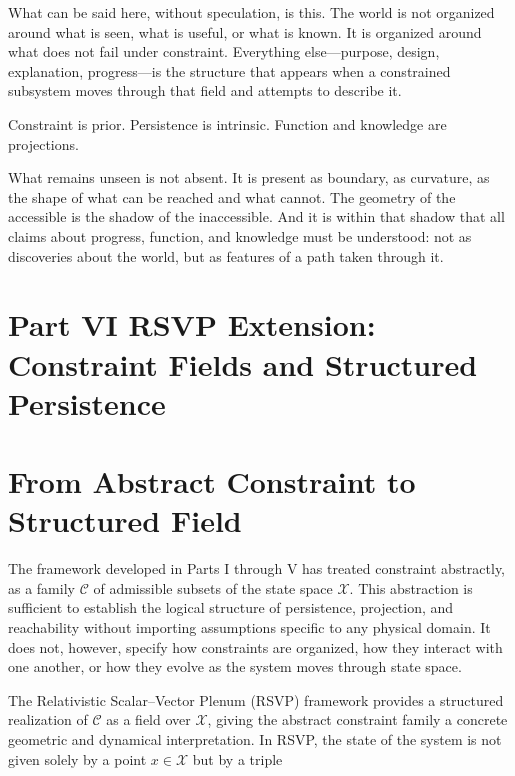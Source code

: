 \documentclass[12pt, a4paper, oneside]{article}
\theoremstyle{plain}
\theoremstyle{definition}
\theoremstyle{remark}
\newcommand{\X}{\mathcal{X}}
\newcommand{\C}{\mathcal{C}}
\begin{document}
What can be said here, without speculation, is this. The world is not organized around what is seen, what is useful, or what is known. It is organized around what does not fail under constraint. Everything else---purpose, design, explanation, progress---is the structure that appears when a constrained subsystem moves through that field and attempts to describe it.

Constraint is prior. Persistence is intrinsic. Function and knowledge are projections.

What remains unseen is not absent. It is present as boundary, as curvature, as the shape of what can be reached and what cannot. The geometry of the accessible is the shadow of the inaccessible. And it is within that shadow that all claims about progress, function, and knowledge must be understood: not as discoveries about the world, but as features of a path taken through it.

\section*{Part VI \quad RSVP Extension: Constraint Fields and Structured Persistence}

\setcounter{section}{23}

\section{From Abstract Constraint to Structured Field}

The framework developed in Parts I through V has treated constraint abstractly, as a family $\C$ of admissible subsets of the state space $\X$. This abstraction is sufficient to establish the logical structure of persistence, projection, and reachability without importing assumptions specific to any physical domain. It does not, however, specify how constraints are organized, how they interact with one another, or how they evolve as the system moves through state space.

The Relativistic Scalar--Vector Plenum (RSVP) framework provides a structured realization of $\C$ as a field over $\X$, giving the abstract constraint family a concrete geometric and dynamical interpretation. In RSVP, the state of the system is not given solely by a point $x \in \X$ but by a triple
\end{document}
